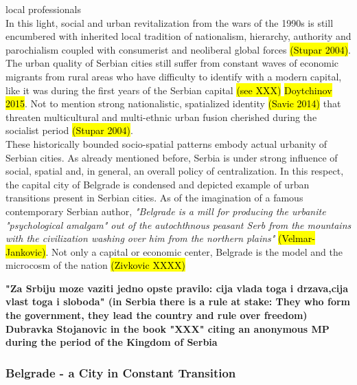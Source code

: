 \documentclass[11pt]{report}
\begin{document}
local professionals  
\\
In this light, social and urban revitalization from the wars of the 1990s is still encumbered with inherited local tradition of nationalism, hierarchy, authority and parochialism coupled with consumerist and neoliberal global forces \hl{(Stupar 2004)}. The urban quality of Serbian cities still suffer from constant waves of economic migrants from rural areas who have difficulty to identify with a modern capital, like it was during the first years of the Serbian capital \hl{(see XXX)} \hl{Doytchinov 2015}. Not to mention strong nationalistic, spatialized identity \hl{(Savic 2014)} that threaten multicultural and multi-ethnic urban fusion cherished during the socialist period \hl{(Stupar 2004)}.
\\
These historically bounded socio-spatial patterns embody actual urbanity of Serbian cities. As already mentioned before, Serbia is under strong influence of social, spatial and, in general, an overall policy of centralization. In this respect, the capital city of Belgrade is condensed and depicted example of urban transitions present in Serbian cities.
As of the imagination of a famous contemporary Serbian author, \textit{"Belgrade is a mill for producing the urbanite "psychological amalgam" out of the autochthnous peasant Serb from the mountains with the civilization washing over him from the northern plains"} \hl{(Velmar-Jankovic)}. Not only a capital or economic center, Belgrade is the model and the microcosm of the nation \hl{(Zivkovic XXXX)}

\textbf{"Za Srbiju moze vaziti jedno opste pravilo: cija vlada toga i drzava,cija vlast toga i sloboda" (in Serbia there is a rule at stake: They who form the government, they lead the country and rule over freedom) Dubravka Stojanovic in the book "XXX" citing an anonymous MP during the period of the Kingdom of Serbia}

\subsubsection{Belgrade - a City in Constant Transition}
\end{document}
